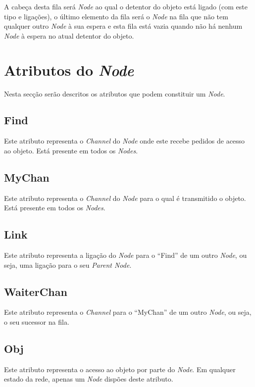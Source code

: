 A cabeça desta fila será \emph{Node} ao qual o detentor do objeto está ligado (com este tipo e ligações), o último elemento da fila será o \emph{Node} na fila que não tem qualquer outro \emph{Node} à sua espera e esta fila está vazia quando não há nenhum \emph{Node} à espera no atual detentor do objeto.


\section{Atributos do \emph{Node}}
\label{especificacao:atr:section}
Nesta secção serão descritos os atributos que podem constituir um \emph{Node}.

\subsection*{Find}
\label{especificacao:atr:Find}
    Este atributo representa o \emph{Channel} do \emph{Node} onde este recebe pedidos de acesso ao objeto.
    Está presente em todos os \emph{Nodes}.

\subsection*{MyChan}
\label{especificacao:atr:mychan}
    Este atributo representa o \emph{Channel} do \emph{Node} para o qual é transmitido o objeto.
    Está presente em todos os \emph{Nodes}.

\subsection*{Link}
\label{especificacao:atr:link}
Este atributo representa a ligação do \emph{Node} para o ``Find'' de um outro \emph{Node}, ou seja, uma ligação para o seu \emph{Parent Node}.

\subsection*{WaiterChan}
\label{especificacao:atr:waiterchan}
    Este atributo representa o \emph{Channel} para o ``MyChan'' de um outro \emph{Node}, ou seja, o seu sucessor na fila.

\subsection*{Obj}
\label{especificacao:atr:obj}
    Este atributo representa o acesso ao objeto por parte do \emph{Node}.
    Em qualquer estado da rede, apenas um \emph{Node} dispões deste atributo.


